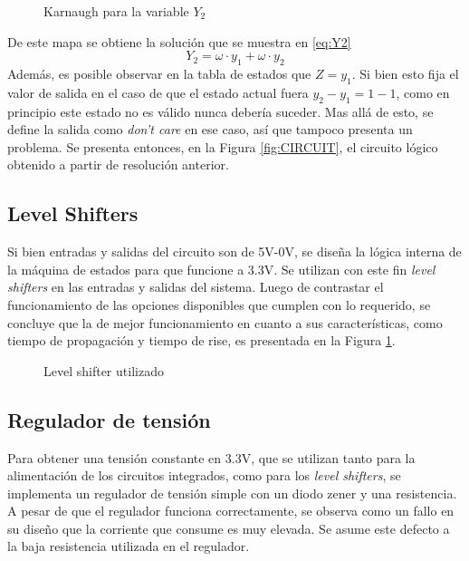 \begin{figure}[H]
    \centering    
        \begin{Karnaughvuit}


        \end{Karnaughvuit}
        \caption{Karnaugh para la variable $Y_2$}    
\end{figure}
De este mapa se obtiene la soluci\'on que se muestra en \ref{eq:Y2}  
\begin{equation}
    Y_2 = \omega \cdot y_1 + \omega \cdot y_2
    \label{eq:Y2}
\end{equation}
Adem\'as, es posible observar en la tabla de estados que $Z = y_1$. Si bien esto fija el valor de salida en el caso de que el estado actual fuera $y_2-y_1 = 1-1$, como en principio este estado no es v\'alido nunca deber\'ia suceder. Mas all\'a de esto, se define la salida como \textit{don't care} en ese caso, as\'i que tampoco presenta un problema.
Se presenta entonces, en la Figura \ref{fig:CIRCUIT}, el circuito l\'ogico obtenido a partir de resoluci\'on anterior.

\subsection{Level Shifters}
Si bien entradas y salidas del circuito son de 5V-0V, se dise\~na la l\'ogica interna de la m\'aquina de estados para que funcione a 3.3V. Se utilizan con este fin \textit{level shifters} en  las entradas y salidas del sistema.
Luego de contrastar el funcionamiento de las opciones disponibles que cumplen con lo requerido, se concluye que la de mejor funcionamiento en cuanto a sus caracter\'isticas, como tiempo de propagaci\'on y tiempo de rise, es presentada en la Figura \ref{fig:LEVEL_SHIFTER}.

\begin{figure}[H]
    \centering
    \caption{Level shifter utilizado}
    \label{fig:LEVEL_SHIFTER}
\end{figure}
\subsection{Regulador de tensi\'on}
Para obtener una tensi\'on constante en 3.3V, que se utilizan tanto  para la alimentaci\'on de los circuitos integrados, como para los \textit{level shifters}, se implementa un regulador de tensi\'on simple con un diodo zener y una resistencia.
A pesar de que el regulador funciona correctamente, se observa como un fallo en su dise\~no que la corriente que consume es muy elevada. Se asume este defecto a la baja resistencia utilizada en el regulador. 
